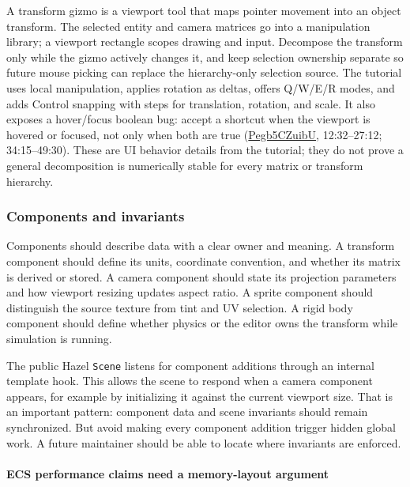 A transform gizmo is a viewport tool that maps pointer movement into an object transform. The selected entity and camera matrices go into a manipulation library; a viewport rectangle scopes drawing and input. Decompose the transform only while the gizmo actively changes it, and keep selection ownership separate so future mouse picking can replace the hierarchy-only selection source. The tutorial uses local manipulation, applies rotation as deltas, offers Q/W/E/R modes, and adds Control snapping with steps for translation, rotation, and scale. It also exposes a hover/focus boolean bug: accept a shortcut when the viewport is hovered or focused, not only when both are true (\href{https://www.youtube.com/watch?v=Pegb5CZuibU}{Pegb5CZuibU}, 12:32--27:12; 34:15--49:30). These are UI behavior details from the tutorial; they do not prove a general decomposition is numerically stable for every matrix or transform hierarchy.

\subsubsection{Components and invariants}\label{06-engine-ii-ch031-components-and-invariants}

Components should describe data with a clear owner and meaning. A transform component should define its units, coordinate convention, and whether its matrix is derived or stored. A camera component should state its projection parameters and how viewport resizing updates aspect ratio. A sprite component should distinguish the source texture from tint and UV selection. A rigid body component should define whether physics or the editor owns the transform while simulation is running.

The public Hazel \texttt{Scene} listens for component additions through an internal template hook. This allows the scene to respond when a camera component appears, for example by initializing it against the current viewport size. That is an important pattern: component data and scene invariants should remain synchronized. But avoid making every component addition trigger hidden global work. A future maintainer should be able to locate where invariants are enforced.

\paragraph{ECS performance claims need a memory-layout argument}\label{06-engine-ii-ch031-ecs-performance-claims-need-a-memory-layout-argument}

